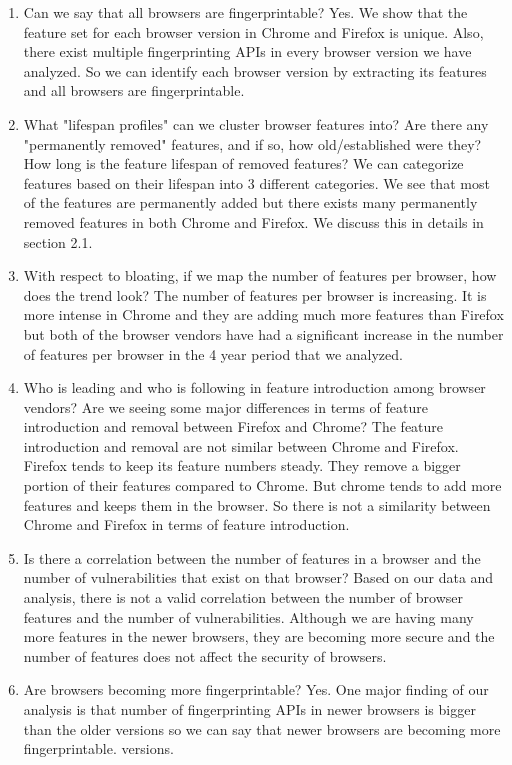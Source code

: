 \begin{enumerate}
  
\item Can we say that all browsers are fingerprintable? Yes. We show
  that the feature set for each browser version in Chrome
  and Firefox is unique. Also, there exist multiple fingerprinting
  APIs in every browser version we have analyzed. So we can identify
  each browser version by extracting its features and all browsers are
  fingerprintable.
  
  \item What "lifespan profiles" can we cluster browser features into?
    Are there any "permanently removed" features, and if so, how
    old/established were they? How long is the feature lifespan of
    removed features? We can categorize features based on their
    lifespan into 3 different categories. We see that most of the
    features are permanently added but there exists many permanently
    removed features in both Chrome and Firefox. We discuss this in
    details in section 2.1.
    
  \item With respect to bloating, if we map the number of features per
    browser, how does the trend look? The number of features per
    browser is increasing. It is more intense in Chrome and they are
    adding much more features than Firefox but both of the browser
    vendors have had a significant increase in the number of features
    per browser in the 4 year period that we analyzed.
    
  \item Who is leading and who is following in feature introduction
    among browser vendors? Are we seeing some major differences in
    terms of feature introduction and removal between Firefox and
    Chrome? The feature introduction and removal are not similar
    between Chrome and Firefox. Firefox tends to keep its feature
    numbers steady. They remove a bigger portion of their features
    compared to Chrome. But chrome tends to add more features and
    keeps them in the browser. So there is not a similarity between
    Chrome and Firefox in terms of feature introduction.
    
  \item Is there a correlation between the number of features in a
    browser and the number of vulnerabilities that exist on that
    browser? Based on our data and analysis, there is not a valid
    correlation between the number of browser features and the number
    of vulnerabilities. Although we are having many more features in
    the newer browsers, they are becoming more secure and the number
    of features does not affect the security of browsers.
    
  \item Are browsers becoming more fingerprintable? Yes. One major
    finding of our analysis is that number of fingerprinting APIs in
    newer browsers is bigger than the older versions so we can say
    that newer browsers are becoming more fingerprintable. versions.
    
\end{enumerate}

